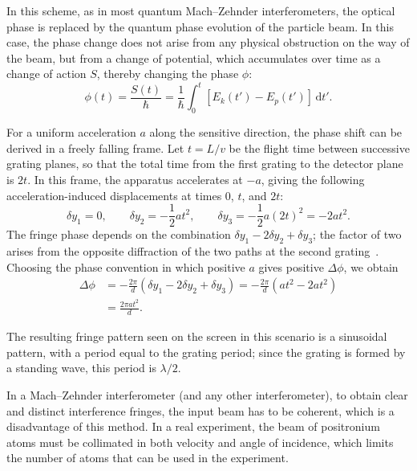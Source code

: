 \documentclass[12pt]{report}
\begin{document}
In this scheme, as in most quantum Mach--Zehnder interferometers, the optical phase is replaced by the quantum phase evolution of the particle beam. In this case, the phase change does not arise from any physical obstruction on the way of the beam, but from a change of potential, which accumulates over time as a change of action \(S\), thereby changing the phase \(\phi\):
\begin{equation} 
    \phi(t)
    = \frac{S(t)}{\hbar}
    = \frac{1}{\hbar} \int_{0}^{t} \left[E_k(t')-E_p(t')\right]\,\mathrm{d}t'.
\end{equation}

For a uniform acceleration \(a\) along the sensitive direction, the phase shift can be derived in a freely falling frame. Let \(t=L/v\) be the flight time between successive grating planes, so that the total time from the first grating to the detector plane is \(2t\). In this frame, the apparatus accelerates at \(-a\), giving the following acceleration-induced displacements at times \(0\), \(t\), and \(2t\):
\begin{equation}
    \delta y_1=0,\qquad
    \delta y_2=-\frac{1}{2}at^2,\qquad
    \delta y_3=-\frac{1}{2}a(2t)^2=-2at^2.
\end{equation}
The fringe phase depends on the combination \(\delta y_1-2\delta y_2+\delta y_3\); the factor of two arises from the opposite diffraction of the two paths at the second grating~\cite{Cronin_Schmiedmayer_Pritchard_2009}. Choosing the phase convention in which positive \(a\) gives positive \(\Delta\phi\), we obtain
\begin{equation}
    \begin{aligned}
        \Delta\phi &=-\frac{2\pi}{d}
        \left(\delta y_1-2\delta y_2+\delta y_3\right)
        =-\frac{2\pi}{d}\left(at^2-2at^2\right) \\
        &=\frac{2\pi at^2}{d}.
    \end{aligned}
    \label{eq:mz-acceleration-phase}
\end{equation}


The resulting fringe pattern seen on the screen in this scenario is a sinusoidal pattern, with a period equal to the grating period; since the grating is formed by a standing wave, this period is $\lambda/2$.

In a Mach--Zehnder interferometer (and any other interferometer), to obtain clear and distinct interference fringes, the input beam has to be coherent, which is a disadvantage of this method. In a real experiment, the beam of positronium atoms must be collimated in both velocity and angle of incidence, which limits the number of atoms that can be used in the experiment.
\end{document}
